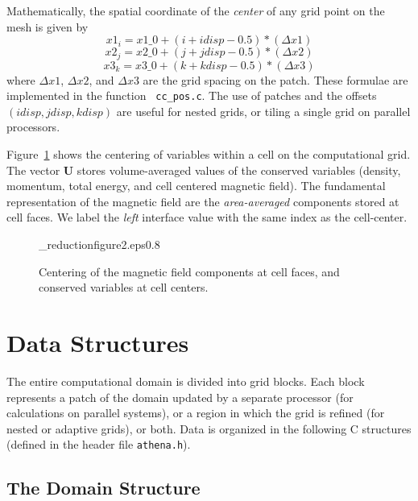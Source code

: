 Mathematically, the spatial coordinate of the {\em center} of any grid point
on the mesh is given by
\begin{displaymath}
  x1_{i} = x1\_0 + (i + idisp - 0.5)*(\Delta x1)
\end{displaymath}
\begin{displaymath}
  x2_{j} = x2\_0 + (j + jdisp - 0.5)*(\Delta x2)
\end{displaymath}
\begin{displaymath}
  x3_{k} = x3\_0 + (k + kdisp - 0.5)*(\Delta x3)
\end{displaymath}
where $\Delta x1$, $\Delta x2$, and $\Delta x3$ are the grid spacing
on the patch.  These formulae are implemented in the function {\tt
cc\_pos.c}.  The use of patches and the offsets $(idisp, jdisp, kdisp)$ are
useful for nested grids, or tiling a single grid on parallel processors.

Figure~\ref{f:gridcell} shows the centering of variables within a cell
on the computational grid.  The vector {\bf U} stores volume-averaged
values of the conserved variables (density, momentum, total energy, and
cell centered magnetic field).  The fundamental representation of the
magnetic field are the {\em area-averaged} components stored at cell faces. 
We label the {\em left} interface value with the same index as the cell-center.

\begin{figure}[htb!]
\plotone_reduction{figure2.eps}{0.8}
\caption{Centering of the magnetic field components at cell faces, and
conserved variables at cell centers.}
\label{f:gridcell}
\end{figure}


\section{Data Structures}

The entire computational domain is divided into grid blocks.  Each block
represents a patch of the domain updated by a separate processor (for
calculations on parallel systems), or
a region in which the grid is refined (for nested or adaptive grids), or
both.  Data is organized in the following C structures (defined in 
the header file {\tt athena.h}).

\subsection{The Domain Structure}


